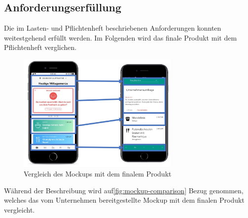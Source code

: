 \subsection{Anforderungserfüllung}
Die im Lasten- und Pflichtenheft beschriebenen Anforderungen konnten weitestgehend erfüllt werden. Im Folgenden wird das finale Produkt mit dem Pflichtenheft verglichen. 
\begin{figure}[H]
\centering
\includegraphics[width=0.7\textwidth]{images/docs-comparison}
\caption[Vergleich des Mockups mit dem finalem Produkt]{Vergleich des Mockups mit dem finalem Produkt}
\label{fig:mockup-comparison}
\end{figure}

Während der Beschreibung wird auf\vref{fig:mockup-comparison} Bezug genommen, welches das vom Unternehmen bereitgestellte Mockup mit dem finalen Produkt vergleicht.

